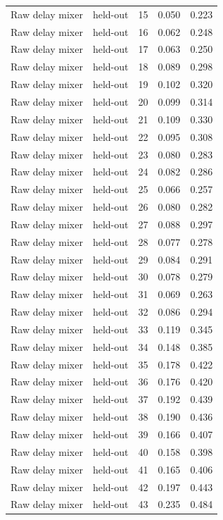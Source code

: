 \begin{tabular}{llrrr}
Raw delay mixer & held-out & 15 & 0.050 & 0.223 \\
Raw delay mixer & held-out & 16 & 0.062 & 0.248 \\
Raw delay mixer & held-out & 17 & 0.063 & 0.250 \\
Raw delay mixer & held-out & 18 & 0.089 & 0.298 \\
Raw delay mixer & held-out & 19 & 0.102 & 0.320 \\
Raw delay mixer & held-out & 20 & 0.099 & 0.314 \\
Raw delay mixer & held-out & 21 & 0.109 & 0.330 \\
Raw delay mixer & held-out & 22 & 0.095 & 0.308 \\
Raw delay mixer & held-out & 23 & 0.080 & 0.283 \\
Raw delay mixer & held-out & 24 & 0.082 & 0.286 \\
Raw delay mixer & held-out & 25 & 0.066 & 0.257 \\
Raw delay mixer & held-out & 26 & 0.080 & 0.282 \\
Raw delay mixer & held-out & 27 & 0.088 & 0.297 \\
Raw delay mixer & held-out & 28 & 0.077 & 0.278 \\
Raw delay mixer & held-out & 29 & 0.084 & 0.291 \\
Raw delay mixer & held-out & 30 & 0.078 & 0.279 \\
Raw delay mixer & held-out & 31 & 0.069 & 0.263 \\
Raw delay mixer & held-out & 32 & 0.086 & 0.294 \\
Raw delay mixer & held-out & 33 & 0.119 & 0.345 \\
Raw delay mixer & held-out & 34 & 0.148 & 0.385 \\
Raw delay mixer & held-out & 35 & 0.178 & 0.422 \\
Raw delay mixer & held-out & 36 & 0.176 & 0.420 \\
Raw delay mixer & held-out & 37 & 0.192 & 0.439 \\
Raw delay mixer & held-out & 38 & 0.190 & 0.436 \\
Raw delay mixer & held-out & 39 & 0.166 & 0.407 \\
Raw delay mixer & held-out & 40 & 0.158 & 0.398 \\
Raw delay mixer & held-out & 41 & 0.165 & 0.406 \\
Raw delay mixer & held-out & 42 & 0.197 & 0.443 \\
Raw delay mixer & held-out & 43 & 0.235 & 0.484 \\

\end{tabular}
